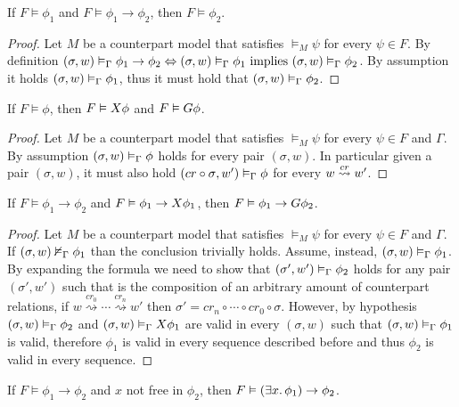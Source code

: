 \begin{lemma}\label{lem:mp}
  If $F \vDash \phi_1$ and $F \vDash \phi_1 \to \phi_2$, then $F \vDash \phi_2$.
\end{lemma}
\begin{proof}
  Let $M$ be a counterpart model that satisfies $\vDash_M \psi$ for every $\psi \in F$.
  By definition $({\sigma}, {w}) \vDash_{\Gamma} {\phi_1 \to \phi_2} \Leftrightarrow ({\sigma}, {w}) \vDash_{\Gamma} {\phi_1}
  \text{ implies } ({\sigma}, {w}) \vDash_{\Gamma} {\phi_2}$. By assumption it holds $({\sigma}, {w}) \vDash_{\Gamma} {\phi_1}$, thus it must
  hold that $({\sigma}, {w}) \vDash_{\Gamma} {\phi_2}$.
\end{proof}
\begin{lemma}\label{lem:nex}
  If $F \vDash \phi$, then $F \vDash X{\phi}$ and $F \vDash G{\phi}$.
\end{lemma}
\begin{proof}
  Let $M$ be a counterpart model that satisfies $\vDash_M \psi$ for every $\psi \in F$ and $\Gamma$.
  By assumption $({\sigma}, {w}) \vDash_{\Gamma} {\phi}$ holds for every pair $(\sigma, w)$. In particular given a pair $(\sigma,
  w)$, it must also hold $({cr \circ \sigma}, {w'}) \vDash_{\Gamma} {\phi}$ for every $w \overset{cr}{\rightsquigarrow} w'$.
\end{proof}
\begin{lemma}\label{lem:ind}
  If $F \vDash \phi_1 \to \phi_2$ and $F \vDash \phi_1 \to X{\phi_1}$, then $F \vDash \phi_1 \to G{\phi_2}$.
\end{lemma}
\begin{proof}
  Let $M$ be a counterpart model that satisfies $\vDash_M \psi$ for every $\psi \in F$ and $\Gamma$.  If
  $({\sigma}, {w}) \nvDash_{\Gamma} {\phi_1}$ than the conclusion trivially holds. Assume, instead,
  $({\sigma}, {w}) \vDash_{\Gamma} {\phi_1}$. By expanding the formula we need to show that $({\sigma'}, {w'}) \vDash_{\Gamma} {\phi_2}$
  holds for any pair $(\sigma', w')$ such that is the composition of an arbitrary amount of counterpart relations, if $w
  \overset{cr_0}{\rightsquigarrow} \cdots \overset{cr_n}{\rightsquigarrow} w'$ then $\sigma' = cr_n \circ \cdots \circ
  cr_0 \circ \sigma$. However, by hypothesis $({\sigma}, {w}) \vDash_{\Gamma} {\phi_2}$ and
  $({\sigma}, {w}) \vDash_{\Gamma} {X{\phi_1}}$ are valid in every $(\sigma, w)$ such that
  $({\sigma}, {w}) \vDash_{\Gamma} {\phi_1}$ is valid, therefore $\phi_1$ is valid in every sequence described before and thus
  $\phi_2$ is valid in every sequence.
\end{proof}
\begin{lemma}\label{lem:par}
  If $F \vDash \phi_1 \to \phi_2$ and $x$ not free in $\phi_2$, then $F \vDash (\exists {x} \ldotp {\phi_1}) \to \phi_2$.
\end{lemma}
